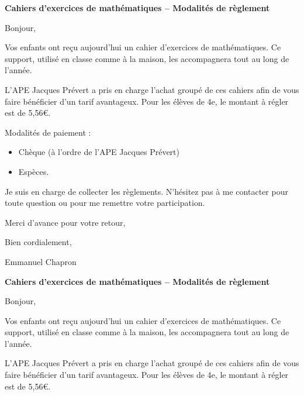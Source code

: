 \documentclass[a4paper]{book}
\begin{document}
\setcounter{chapter}{1}
\newcommand{\montant}{5,56}
\newcommand{\classe}{4e}

    \textbf{Cahiers d’exercices de mathématiques – Modalités de règlement}
    
    Bonjour,

    \medskip
    
    Vos enfants ont reçu aujourd’hui un cahier d’exercices de mathématiques. Ce support, utilisé en classe comme à la maison, les accompagnera tout au long de l’année.

    \medskip

    L’APE Jacques Prévert a pris en charge l’achat groupé de ces cahiers afin de vous faire bénéficier d’un tarif avantageux. Pour les élèves de \classe, le montant à régler est de \montant €.
    
    \medskip

    Modalités de paiement :
    \begin{itemize}
        \item Chèque (à l’ordre de l’APE Jacques Prévert)
        \item Espèces.
    \end{itemize}

    \medskip
    
    Je suis en charge de collecter les règlements. N’hésitez pas à me contacter pour toute question ou pour me remettre votre participation.
    
    Merci d’avance pour votre retour,
    
    Bien cordialement,
    
    Emmanuel Chapron


    \vspace{2cm}
    

    \textbf{Cahiers d’exercices de mathématiques – Modalités de règlement}
    
    Bonjour,

    \medskip
    
    Vos enfants ont reçu aujourd’hui un cahier d’exercices de mathématiques. Ce support, utilisé en classe comme à la maison, les accompagnera tout au long de l’année.

    \medskip

    L’APE Jacques Prévert a pris en charge l’achat groupé de ces cahiers afin de vous faire bénéficier d’un tarif avantageux. Pour les élèves de \classe, le montant à régler est de \montant €.
    
    \medskip
\end{document}
